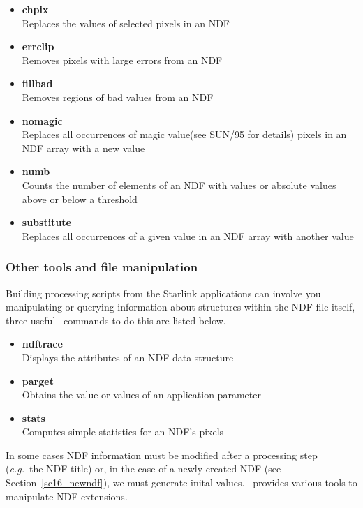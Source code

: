 \documentclass[twoside,11pt]{article}
\newcommand{\htmlref}[2]{#1}
\newcommand{\latex}[1]{#1}
\newcommand{\xref}[3]{#1}
\begin{document}
{\begin{itemize}
\item{\xref{{\bf chpix}}{sun95}{CHPIX}}\\ 
Replaces the values of selected pixels in an NDF 
\item{\xref{{\bf errclip}}{sun95}{ERRCLIP}}\\ 
Removes pixels with large errors from an NDF 
\item{\xref{{\bf fillbad}}{sun95}{FILLBAD}}\\ 
Removes regions of bad values from an NDF 
\item{\xref{{\bf nomagic}}{sun95}{NOMAGIC}}\\ 
Replaces all occurrences of \xref{magic value}{sun95}{se_masking}\latex{(see SUN/95 for details)} 
pixels in an NDF array with a new value 
\item{\xref{{\bf numb}}{sun95}{NUMB}}\\ 
Counts the number of elements of an NDF with values or absolute values above or below a threshold 
\item{\xref{{\bf substitute}}{sun95}{SUBSTITUTE}}\\
Replaces all occurrences of a given value in an NDF array with another value 
\end{itemize}

\subsubsection{Other tools and file manipulation}

Building processing scripts from the Starlink applications can involve
you manipulating or querying information about structures within the
NDF file itself, three useful \KAPPAref\ commands to do this are listed
below.

\begin{itemize}
\item{\xref{{\bf ndftrace}}{sun95}{NDFTRACE}}\\
Displays the attributes of an NDF data structure 
\item{\xref{{\bf parget}}{sun95}{PARGET}}\\
Obtains the value or values of an application parameter 
\item{\xref{{\bf stats}}{sun95}{STATS}}\\
Computes simple statistics for an NDF's pixels  
\end{itemize}  

In some cases NDF information must be modified after a processing step
(\emph{e.g.}\ the NDF title) or, in the case of a \htmlref{newly
created}{sc16_newndf} NDF\latex{ (see Section~\ref{sc16_newndf})},
we must generate inital values.  \KAPPA\ provides various tools to
manipulate NDF extensions.

}
\end{document}
